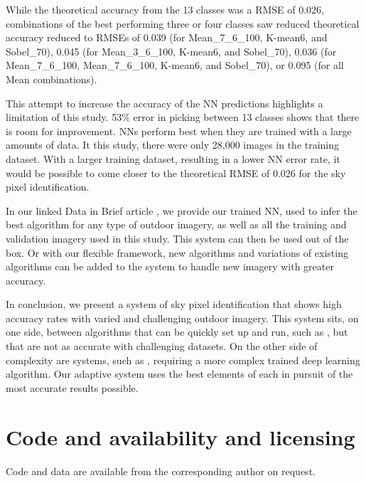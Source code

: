 \documentclass[final,3p,times,authoryear]{elsarticle}
\begin{document}
While the theoretical accuracy from the 13 classes was a RMSE of 0.026, combinations of the best performing three or four classes saw reduced theoretical accuracy reduced to RMSEs of 0.039 (for Mean\_7\_6\_100, K-mean6, and Sobel\_70), 0.045 (for Mean\_3\_6\_100, K-mean6, and Sobel\_70), 0.036 (for Mean\_7\_6\_100, Mean\_7\_6\_100, K-mean6, and Sobel\_70), or 0.095 (for all Mean combinations). 

This attempt to increase the accuracy of the NN predictions highlights a limitation of this study. 53\% error in picking between 13 classes shows that there is room for improvement. NNs perform best when they are trained with a large amounts of data. It this study, there were only 28,000 images in the training dataset. With a larger training dataset, resulting in a lower NN error rate, it would be possible to come closer to the theoretical RMSE of 0.026 for the sky pixel identification.

In our linked Data in Brief article \citep{Nice2019Data}, we provide our trained NN, used to infer the best algorithm for any type of outdoor imagery, as well as all the training and validation imagery used in this study. This system can then be used out of the box. Or with our flexible framework, new algorithms and variations of existing algorithms can be added to the system to handle new imagery with greater accuracy. 

In conclusion, we present a system of sky pixel identification that shows high accuracy rates with varied and challenging outdoor imagery. This system sits, on one side, between algorithms that can be quickly set up and run, such as \cite{Middel2018}, but that are not as accurate with challenging datasets. On the other side of complexity are systems, such as \cite{Gong2018}, requiring a more complex trained deep learning algorithm. Our adaptive system uses the best elements of each in pursuit of the most accurate results possible.




\section{Code and availability and licensing}\label{sec:available}
Code and data are available from the corresponding author on request.


\end{document}

